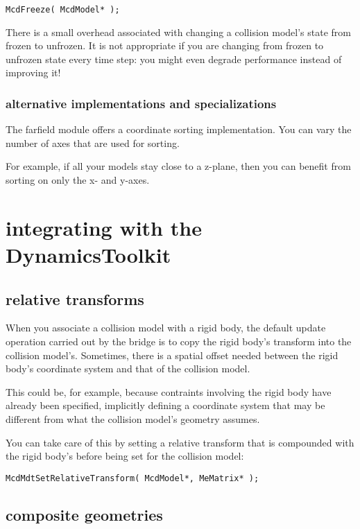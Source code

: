 \documentclass[11pt]{article}
\begin{document}
\begin{verbatim}
McdFreeze( McdModel* );
\end{verbatim}

There is a small overhead associated with changing a collision model's
state from frozen to unfrozen. It is not appropriate if you are changing from frozen to unfrozen
state every time step: you might even degrade performance instead of
improving it!
 
\subsubsection{ alternative implementations and specializations }

The farfield module offers a coordinate sorting implementation.
You can vary the number of axes that are used for sorting.

For example, if all your models stay close to a z-plane, then you can
benefit from sorting on only the x- and y-axes.

\section{ integrating with the DynamicsToolkit }

\subsection{ relative transforms }

When you associate a collision model with a rigid body, the default update
operation carried out by the bridge is to copy the rigid body's transform
into the collision model's.
 Sometimes, there is a spatial offset needed between the rigid body's
 coordinate system and that of the collision model. 

This could be, for
 example, because contraints involving the rigid body have already been
 specified, implicitly defining a coordinate system that may be different
 from what the collision model's geometry assumes.


You can take care of this by setting a relative transform that is
compounded with the rigid body's before being set for the collision model:
\begin{verbatim}
McdMdtSetRelativeTransform( McdModel*, MeMatrix* );
\end{verbatim}

\subsection{ composite geometries }
\end{document}
